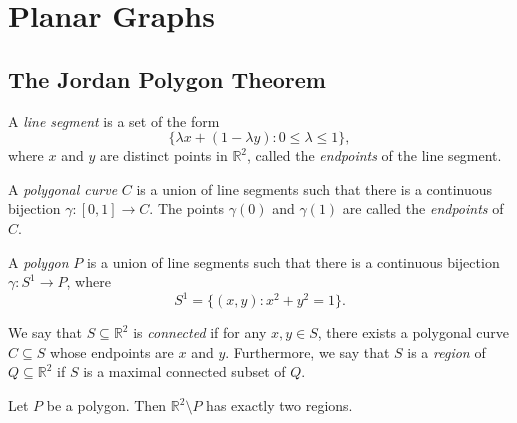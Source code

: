 \chapter{Planar Graphs}
\section{The Jordan Polygon Theorem}
\begin{definition}
  A \emph{line segment} is a set of the form
  \begin{equation*}
    \{\lambda x + (1 - \lambda y): 0 \leq \lambda \leq 1\},
  \end{equation*}
  where $x$ and $y$ are distinct points in $\mathbb{R}^2$, called the
  \emph{endpoints} of the line segment.
\end{definition}

\begin{definition}
  A \emph{polygonal curve} $C$ is a union of line segments such that there is
  a continuous bijection $\gamma: [0, 1] \to C$.
  The points $\gamma(0)$ and $\gamma(1)$ are called the \emph{endpoints} of
  $C$.
\end{definition}

\begin{definition}
  A \emph{polygon} $P$ is a union of line segments such that there is
  a continuous bijection $\gamma: S^1 \to P$, where
  \begin{equation*}
    S^1 = \{(x, y): x^2 + y^2 = 1\}.
  \end{equation*}
\end{definition}

\begin{definition}
  We say that $S \subseteq \mathbb{R}^2$ is \emph{connected} if for any
  $x, y \in S$, there exists a polygonal curve $C \subseteq S$ whose endpoints
  are $x$ and $y$.
  Furthermore, we say that $S$ is a \emph{region} of $Q \subseteq \mathbb{R}^2$
  if $S$ is a maximal connected subset of $Q$.
\end{definition}

\begin{theorem}
  Let $P$ be a polygon.
  Then $\mathbb{R}^2 \setminus P$ has exactly two regions.
\end{theorem}

